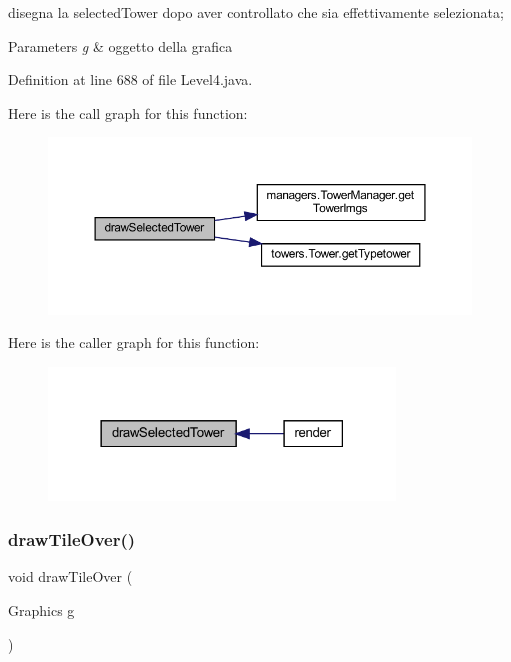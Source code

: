 disegna la selected\+Tower dopo aver controllato che sia effettivamente selezionata; 


\begin{DoxyParams}{Parameters}
{\em g} & oggetto della grafica \\
\hline
\end{DoxyParams}


Definition at line 688 of file Level4.\+java.

Here is the call graph for this function\+:
\nopagebreak
\begin{figure}[H]
\begin{center}
\leavevmode
\includegraphics[width=350pt]{classscenes_1_1_level4_a0a97d0bb6d32640b2ae351707946abf7_cgraph}
\end{center}
\end{figure}
Here is the caller graph for this function\+:\nopagebreak
\begin{figure}[H]
\begin{center}
\leavevmode
\includegraphics[width=261pt]{classscenes_1_1_level4_a0a97d0bb6d32640b2ae351707946abf7_icgraph}
\end{center}
\end{figure}
\mbox{\label{classscenes_1_1_level4_ac299bbbbb70f97ae032c1345d5937378}} 
\subsubsection{\texorpdfstring{draw\+Tile\+Over()}{drawTileOver()}}
{\footnotesize\ttfamily void draw\+Tile\+Over (\begin{DoxyParamCaption}\item[{Graphics}]{g }\end{DoxyParamCaption})\hspace{0.3cm}{\ttfamily [private]}}




